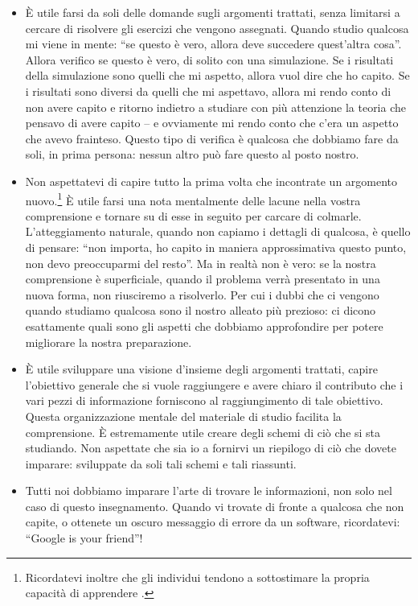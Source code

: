 \documentclass[
  11pt,
]{krantz}
\begin{document}
\begin{itemize}
\item
  È utile farsi da soli delle domande sugli argomenti trattati, senza limitarsi a cercare di risolvere gli esercizi che vengono assegnati. Quando studio qualcosa mi viene in mente: ``se questo è vero, allora deve succedere quest'altra cosa''. Allora verifico se questo è vero, di solito con una simulazione. Se i risultati della simulazione sono quelli che mi aspetto, allora vuol dire che ho capito. Se i risultati sono diversi da quelli che mi aspettavo, allora mi rendo conto di non avere capito e ritorno indietro a studiare con più attenzione la teoria che pensavo di avere capito -- e ovviamente mi rendo conto che c'era un aspetto che avevo frainteso. Questo tipo di verifica è qualcosa che dobbiamo fare da soli, in prima persona: nessun altro può fare questo al posto nostro.
\item
  Non aspettatevi di capire tutto la prima volta che incontrate un argomento nuovo.\footnote{Ricordatevi inoltre che gli individui tendono a sottostimare la propria capacità di apprendere \citep{horn2021underestimating}.} È utile farsi una nota mentalmente delle lacune nella vostra comprensione e tornare su di esse in seguito per carcare di colmarle. L'atteggiamento naturale, quando non capiamo i dettagli di qualcosa, è quello di pensare: ``non importa, ho capito in maniera approssimativa questo punto, non devo preoccuparmi del resto''. Ma in realtà non è vero: se la nostra comprensione è superficiale, quando il problema verrà presentato in una nuova forma, non riusciremo a risolverlo. Per cui i dubbi che ci vengono quando studiamo qualcosa sono il nostro alleato più prezioso: ci dicono esattamente quali sono gli aspetti che dobbiamo approfondire per potere migliorare la nostra preparazione.
\item
  È utile sviluppare una visione d'insieme degli argomenti trattati, capire l'obiettivo generale che si vuole raggiungere e avere chiaro il contributo che i vari pezzi di informazione forniscono al raggiungimento di tale obiettivo. Questa organizzazione mentale del materiale di studio facilita la comprensione. È estremamente utile creare degli schemi di ciò che si sta studiando. Non aspettate che sia io a fornirvi un riepilogo di ciò che dovete imparare: sviluppate da soli tali schemi e tali riassunti.
\item
  Tutti noi dobbiamo imparare l'arte di trovare le informazioni, non solo nel caso di questo insegnamento. Quando vi trovate di fronte a qualcosa che non capite, o ottenete un oscuro messaggio di errore da un software, ricordatevi: ``Google is your friend''!
\end{itemize}
\end{document}
